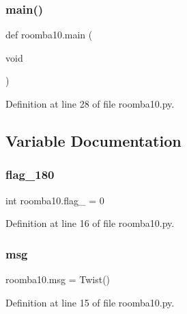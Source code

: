 \subsubsection{\texorpdfstring{main()}{main()}}
{\footnotesize\ttfamily def roomba10.\+main (\begin{DoxyParamCaption}\item[{void}]{ }\end{DoxyParamCaption})}



Definition at line 28 of file roomba10.\+py.



\subsection{Variable Documentation}
\mbox{\label{namespaceroomba10_a8b484caf7d5b397dffa6cd6938606f05}} 
\subsubsection{\texorpdfstring{flag\_180}{flag\_180}}
{\footnotesize\ttfamily int roomba10.\+flag\+\_ = 0}



Definition at line 16 of file roomba10.\+py.

\mbox{\label{namespaceroomba10_aae356700c0d2f6810840867ddf640c14}} 
\subsubsection{\texorpdfstring{msg}{msg}}
{\footnotesize\ttfamily roomba10.\+msg = Twist()}



Definition at line 15 of file roomba10.\+py.

